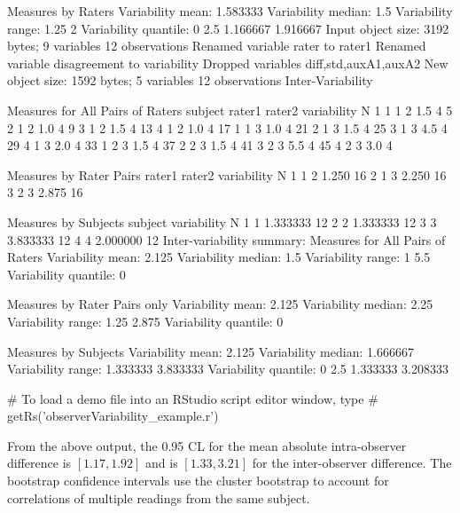 \begin{Schunk}
\begin{Soutput}
Measures by Raters
Variability mean:  1.583333 
Variability median:  1.5 
Variability range:  1.25 2 
Variability quantile: 
0%:  1.25   25%:  1.375   50%:  1.5   75%:  1.75   100%:  2 
    2.5%    97.5% 
1.166667 1.916667 
Input object size:	 3192 bytes;	 9 variables	 12 observations
Renamed variable	 rater 	to rater1 
Renamed variable	 disagreement 	to variability 
Dropped variables	diff,std,auxA1,auxA2
New object size:	1592 bytes;	5 variables	12 observations
Inter-Variability 

Measures for All Pairs of Raters
   subject rater1 rater2 variability N
1        1      1      2         1.5 4
5        2      1      2         1.0 4
9        3      1      2         1.5 4
13       4      1      2         1.0 4
17       1      1      3         1.0 4
21       2      1      3         1.5 4
25       3      1      3         4.5 4
29       4      1      3         2.0 4
33       1      2      3         1.5 4
37       2      2      3         1.5 4
41       3      2      3         5.5 4
45       4      2      3         3.0 4

Measures by Rater Pairs
  rater1 rater2 variability  N
1      1      2       1.250 16
2      1      3       2.250 16
3      2      3       2.875 16

Measures by Subjects
  subject variability  N
1       1    1.333333 12
2       2    1.333333 12
3       3    3.833333 12
4       4    2.000000 12
Inter-variability summary:
Measures for All Pairs of Raters
Variability mean:  2.125 
Variability median:  1.5 
Variability range:  1 5.5 
Variability quantile: 
0%:  1   25%:  1.375   50%:  1.5   75%:  2.25   100%:  5.5 

Measures by Rater Pairs only
Variability mean:  2.125 
Variability median:  2.25 
Variability range:  1.25 2.875 
Variability quantile: 
0%:  1.25   25%:  1.75   50%:  2.25   75%:  2.5625   100%:  2.875 

Measures by Subjects
Variability mean:  2.125 
Variability median:  1.666667 
Variability range:  1.333333 3.833333 
Variability quantile: 
0%:  1.333333   25%:  1.333333   50%:  1.666667   75%:  2.458333   100%:  3.833333 
    2.5%    97.5% 
1.333333 3.208333 
\end{Soutput}
\begin{Sinput}
# To load a demo file into an RStudio script editor window, type
# getRs('observerVariability_example.r')
\end{Sinput}
\end{Schunk}
From the above output, the 0.95 CL for the mean absolute
intra-observer difference is $[1.17, 1.92]$ and is $[1.33, 3.21]$ for the
inter-observer difference.  The bootstrap confidence intervals use the
cluster bootstrap to account for correlations of multiple readings
from the same subject.

